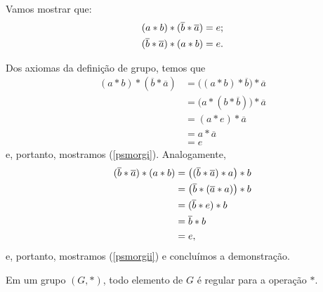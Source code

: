 \begin{dem}
  Vamos mostrar que:
  \begin{align}
    (a\ast b)\ast (\overline{b}\ast \overline{a}) &=
    e\mathrm{;}\label{psmorgi}  \\
    (\overline{b}\ast \overline{a})\ast (a\ast b) &=
    e\mathrm{.}\label{psmorgii}
  \end{align}

  Dos axiomas da definição de grupo, temos que
  \begin{equation*}
    \begin{aligned}
      (a\ast b)\ast (\overline{b}\ast \overline{a})
        &= \bigl((a\ast b)\ast \overline{b}\bigr)\ast \overline{a} \\
        &= \bigl(a\ast (b\ast \overline{b})\bigr)\ast \overline{a} \\
        &= (a\ast e)\ast \overline{a} \\
        &= a\ast \overline{a} \\
        &= e
    \end{aligned}
  \end{equation*}
  e, portanto, mostramos (\ref{psmorgi}). Analogamente,
  \begin{equation*}
    \begin{aligned}
      (\overline{b}\ast \overline{a})\ast (a\ast b)
        &= \bigl((\overline{b}\ast \overline{a})\ast a\bigr)\ast b \\
        &= \bigl(\overline{b}\ast (\overline{a}\ast a)\bigr)\ast b \\
        &= (\overline{b}\ast e)\ast b \\
        &= \overline{b}\ast b \\
        &= e\mathrm{,}
    \end{aligned}
  \end{equation*}
  e, portanto, mostramos (\ref{psmorgii}) e concluímos a demonstração.
\end{dem}

\begin{Propr}\label{regulargrupo}
  Em um grupo $(G,\ast )$, todo elemento de $G$ é regular para a
  operação
  $\ast $.
\end{Propr}

